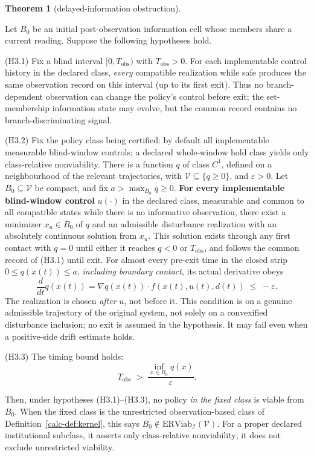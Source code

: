 \documentclass[10pt,twocolumn]{article}
\theoremstyle{definition}
\newtheorem{theorem}{Theorem}
\begin{document}
\begin{theorem}[delayed-information obstruction]\label{calc-thm:delayed}

Let \(B_0\) be an initial post-observation information cell whose
members share a current reading. Suppose the following
hypotheses hold.

(H3.1) Fix a blind interval \([0,T_{\mathrm{obs}})\) with
\(T_{\mathrm{obs}}>0\). For each implementable control history in the
declared class, \emph{every} compatible realization while safe produces
the same observation record on this interval (up to its first exit).
Thus no branch-dependent observation can change the policy's control
before exit; the set-membership information state may evolve, but the
common record contains no branch-discriminating signal.

(H3.2) Fix the policy class being certified: by default all implementable measurable blind-window controls; a declared whole-window hold class yields only class-relative nonviability. There is a function \(q\) of class \(C^1\), defined on a neighbourhood of
the relevant trajectories, with \(\mathcal V\subseteq\{q\ge0\}\),
and \(\varepsilon>0\). Let \(B_0\subseteq\mathcal V\) be compact,
and fix \(a>\max_{B_0}q\ge0\).
\textbf{For every implementable blind-window control} \(u(\cdot)\) in the
declared class, measurable and common to all compatible states while
there is no informative observation, there exist a minimizer
\(x_u\in B_0\) of \(q\) and an admissible disturbance realization
with an absolutely continuous solution from \(x_u\). This solution
exists through any first contact with \(q=0\) until either it reaches
\(q<0\) or \(T_{\mathrm{obs}}\), and follows the common record
of (H3.1) until exit. For almost every pre-exit time in the closed strip
\(0\le q(x(t))\le a\), \emph{including boundary contact},
its actual derivative obeys
\[\frac{d}{dt}q(x(t))=\nabla q(x(t))\cdot f(x(t),u(t),d(t))
\;\le\;-\varepsilon. \tag{2}\]
The realization is chosen \emph{after} \(u\), not before it. This
condition is on a genuine admissible trajectory of the original system,
not solely on a convexified disturbance inclusion; no exit is assumed
in the hypothesis. It may fail even when a positive-side drift estimate
holds.

(H3.3) The timing bound holds:
\[T_{\mathrm{obs}} \;>\; \frac{\inf_{x \in B_0} q(x)}{\varepsilon}. \tag{3}\]

Then, under hypotheses (H3.1)--(H3.3), no policy \emph{in the
fixed class} is viable from \(B_0\). When the fixed class is the
unrestricted observation-based class of Definition~\ref{calc-def:kernel},
this says \(B_0\notin\mathrm{ERViab}_{\mathcal I}(\mathcal V)\).
For a proper declared institutional subclass, it asserts only
class-relative nonviability; it does not exclude unrestricted viability.

\end{theorem}
\end{document}
